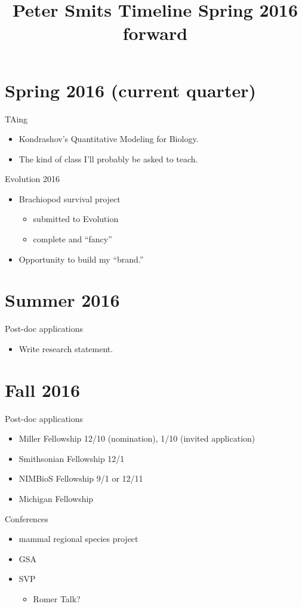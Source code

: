 \documentclass{article}
\title{Peter Smits Timeline Spring 2016 forward}
\date{}
\begin{document}
\linenumbers
\modulolinenumbers[2]

\maketitle

\section{Spring 2016 (current quarter)}
TAing 
\begin{itemize}
  \item Kondrashov's Quantitative Modeling for Biology.
  \item The kind of class I'll probably be asked to teach.
\end{itemize}

Evolution 2016
\begin{itemize}
  \item Brachiopod survival project
    \begin{itemize}
      \item submitted to Evolution
      \item complete and ``fancy''
    \end{itemize}
  \item Opportunity to build my ``brand.''
\end{itemize}


\section{Summer 2016}
Post-doc applications
\begin{itemize}
  \item Write research statement.
\end{itemize}


\section{Fall 2016}
Post-doc applications
\begin{itemize}
  \item Miller Fellowship 12/10 (nomination), 1/10 (invited application)
  \item Smithsonian Fellowship 12/1
  \item NIMBioS Fellowship 9/1 or 12/11
  \item Michigan Fellowship
\end{itemize}

Conferences
\begin{itemize}
  \item mammal regional species project
  \item GSA
  \item SVP
    \begin{itemize}
      \item Romer Talk?
    \end{itemize}
\end{itemize}
\end{document}
